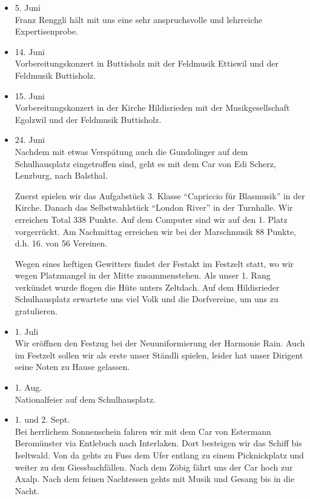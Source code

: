 \begin{history}
\begin{itemize}
        \item[]5. Juni\\
        Franz Renggli hält mit uns eine sehr anspruchsvolle und lehrreiche
        Expertisenprobe.

        \item[]14. Juni\\
        Vorbereitungskonzert in Buttisholz mit der Feldmusik Ettiswil und der
        Feldmusik Buttisholz.

        \item[]15. Juni\\
        Vorbereitungskonzert in der Kirche Hildisrieden mit der
        Musikgesellschaft Egolzwil und der Feldmusik Buttisholz.

        \item[]24. Juni\\
        Nachdem mit etwas Verspätung auch die Gundolinger auf dem Schulhausplatz
        eingetroffen sind, geht es mit dem Car von Edi Scherz, Lenzburg, nach
        Balsthal.

        Zuerst spielen wir das Aufgabstück 3. Klasse \enquote{Capriccio für
            Blasmusik} in der Kirche. Danach das Selbstwahlstück \enquote{London
            River} in der Turnhalle. Wir erreichen Total 338 Punkte. Auf dem
        Computer sind wir auf den 1. Platz vorgerrückt. Am Nachmittag
        erreichen wir bei der Marschmusik 88 Punkte, d.h. 16. von 56
        Vereinen.

        Wegen eines heftigen Gewitters findet der Festakt im Festzelt statt, wo
        wir wegen Platzmangel in der Mitte zusammenstehen. Als unser 1. Rang
        verkündet wurde flogen die Hüte unters Zeltdach. Auf dem Hildisrieder
        Schulhausplatz erwartete uns viel Volk und die Dorfvereine, um uns zu
        gratulieren.

        \item[]1. Juli\\
        Wir eröffnen den Festzug bei der Neuuniformierung der Harmonie Rain.
        Auch im Festzelt sollen wir als erste unser Ständli spielen, leider hat
        unser Dirigent seine Noten zu Hause gelassen.

        \item[]1. Aug.\\
        Nationalfeier auf dem Schulhausplatz.

        \item[]1. und 2. Sept.\\
        Bei herrlichem Sonnenschein fahren wir mit dem Car von Estermann
        Beromünster via Entlebuch nach Interlaken. Dort besteigen wir das Schiff
        bis Iseltwald. Von da gehts zu Fuss dem Ufer entlang zu einem
        Picknickplatz und weiter zu den Giessbachfällen. Nach dem Zöbig fährt
        uns der Car hoch zur Axalp. Nach dem feinen Nachtessen gehts mit Musik
        und Gesang bis in die Nacht.


\end{itemize}
\end{history}
